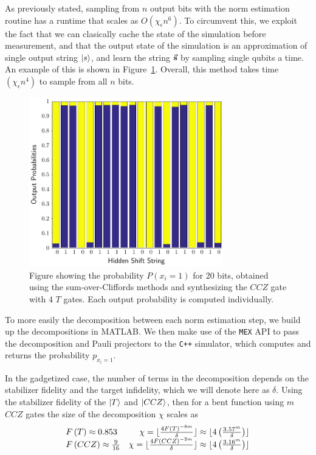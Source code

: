 As previously stated, sampling from $n$ output bits with the norm estimation routine has a runtime that scales as $O\left(\chi_{\epsilon}n^{6}\right)$. To circumvent this, we exploit the fact that we can clasically cache the state of the simulation before measurement, and that the output state of the simulation is an approximation of single output string $\ket{s}$, and learn the string $\va{s}$ by sampling single qubits a time. An example of this is shown in Figure~\ref{fig:hs_readout}. Overall, this method takes time $\left(\chi_{\epsilon}n^{4}\right)$ to sample from all $n$ bits.\par
\begin{figure}[t]
\centering
\includegraphics[width=0.75\textwidth]{Figures/HiddenShiftHistogram.pdf}
\caption{Figure showing the probability $P\left(x_{i}=1\right)$ for $20$ bits, obtained using the sum-over-Cliffords methods and synthesizing the $CCZ$ gate with $4$ $T$ gates. Each output probability is computed individually.}
\label{fig:hs_readout}
\end{figure}
To more easily the decomposition between each norm estimation step, we build up the decompositions in MATLAB. We then make use of the \texttt{MEX} API to pass the decomposition and Pauli projectors to the \texttt{C++} simulator, which computes and returns the probability $p_{x_{i}=1}$.\par
In the gadgetized case, the number of terms in the decomposition depends on the stabilizer fidelity and the target infidelity, which we will denote here as $\delta$. Using the stabilizer fidelity of the $\ket{T}$ and $\ket{CCZ}$, then for a bent function using $m$ $CCZ$ gates the size of the decomposition $\chi$ scales as
\begin{equation}
\begin{array}{l r}
F\left(T\right)\approx 0.853 & \chi = \lfloor\frac{4 F\left(T\right)^{-8m}}{\delta}\rfloor \approx \lfloor 4\left(\frac{3.57^{m}}{\delta}\right)\rfloor\\ 
F\left(CCZ\right)\approx \frac{9}{16} & \chi = \lfloor\frac{4 F\left(CCZ\right)^{-2m}}{\delta}\rfloor \approx \lfloor 4\left(\frac{3.16^{m}}{\delta}\right)\rfloor\\ 
\end{array}
\end{equation}
